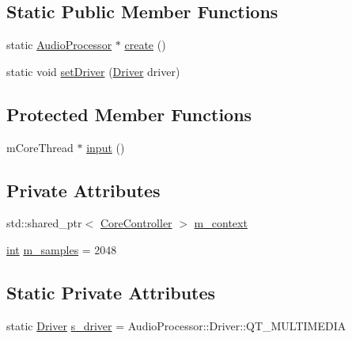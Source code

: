 \subsection*{Static Public Member Functions}
\begin{DoxyCompactItemize}
\item 
static \mbox{\hyperlink{class_q_g_b_a_1_1_audio_processor}{Audio\+Processor}} $\ast$ \mbox{\hyperlink{class_q_g_b_a_1_1_audio_processor_a699614d282aa9cf042df8d23b9b5923a}{create}} ()
\item 
static void \mbox{\hyperlink{class_q_g_b_a_1_1_audio_processor_a7bc53e5c2ced8444d55706e449f4a6b1}{set\+Driver}} (\mbox{\hyperlink{class_q_g_b_a_1_1_audio_processor_a49108637a6edef1b593f66701eb9b4bc}{Driver}} driver)
\end{DoxyCompactItemize}
\subsection*{Protected Member Functions}
\begin{DoxyCompactItemize}
\item 
m\+Core\+Thread $\ast$ \mbox{\hyperlink{class_q_g_b_a_1_1_audio_processor_ad9001a38e63be82cbb2e582ac4162db9}{input}} ()
\end{DoxyCompactItemize}
\subsection*{Private Attributes}
\begin{DoxyCompactItemize}
\item 
std\+::shared\+\_\+ptr$<$ \mbox{\hyperlink{class_q_g_b_a_1_1_core_controller}{Core\+Controller}} $>$ \mbox{\hyperlink{class_q_g_b_a_1_1_audio_processor_a81ac781505b28492c01b34a6f54e80c8}{m\+\_\+context}}
\item 
\mbox{\hyperlink{ioapi_8h_a787fa3cf048117ba7123753c1e74fcd6}{int}} \mbox{\hyperlink{class_q_g_b_a_1_1_audio_processor_a7a112ba2bbdcb4a963b310dc78b60175}{m\+\_\+samples}} = 2048
\end{DoxyCompactItemize}
\subsection*{Static Private Attributes}
\begin{DoxyCompactItemize}
\item 
static \mbox{\hyperlink{class_q_g_b_a_1_1_audio_processor_a49108637a6edef1b593f66701eb9b4bc}{Driver}} \mbox{\hyperlink{class_q_g_b_a_1_1_audio_processor_a5540cf3b98137028dec413f4bb669e59}{s\+\_\+driver}} = Audio\+Processor\+::\+Driver\+::\+Q\+T\+\_\+\+M\+U\+L\+T\+I\+M\+E\+D\+IA
\end{DoxyCompactItemize}


